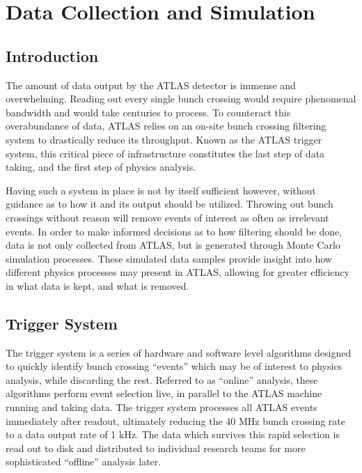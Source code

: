 \chapter{Data Collection and Simulation} \label{chapter:data}

\section{Introduction}

    The amount of data output by the ATLAS detector is immense and overwhelming.
    Reading out every single bunch crossing would require phenomenal bandwidth and would take centuries to process.
    To counteract this overabundance of data, ATLAS relies on an on-site bunch crossing filtering system to drastically reduce its throughput.
    Known as the ATLAS trigger system, this critical piece of infrastructure constitutes the last step of data taking,
        and the first step of physics analysis.
        
    Having such a system in place is not by itself sufficient however,
        without guidance as to how it and its output should be utilized.
    Throwing out bunch crossings without reason will remove events of interest as often as irrelevant events.
    In order to make informed decisions as to how filtering should be done,
        data is not only collected from ATLAS, but is generated through Monte Carlo simulation processes.
    These simulated data samples provide insight into how different physics processes may present in ATLAS,
        allowing for greater efficiency in what data is kept, and what is removed.


\section{Trigger System}

    The trigger system is a series of hardware and software level algorithms designed to quickly identify bunch crossing ``events'' which may be of interest to physics analysis, while discarding the rest.
    Referred to as ``online'' analysis, these algorithms perform event selection live, in parallel to the ATLAS machine running and taking data.
    The trigger system processes all ATLAS events immediately after readout, ultimately reducing the 40 MHz bunch crossing rate to a data output rate of 1 kHz.
    The data which survives this rapid selection is read out to disk and distributed to individual research teams for more sophisticated ``offline'' analysis later.
    
